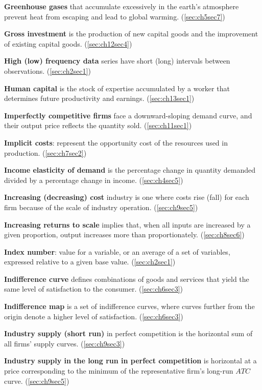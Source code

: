 \textbf{Greenhouse gases} that accumulate excessively in the earth's atmosphere prevent heat from escaping and lead to global warming. (\ref{sec:ch5sec7})

\textbf{Gross investment} is the production of new capital goods and the improvement of existing capital goods. (\ref{sec:ch12sec4})

\textbf{High (low) frequency data} series have short (long) intervals between observations. (\ref{sec:ch2sec1})

\textbf{Human capital} is the stock of expertise accumulated by a worker that determines future productivity and earnings. (\ref{sec:ch13sec1})

\textbf{Imperfectly competitive firms} face a downward-sloping demand curve, and their output price reflects the quantity sold. (\ref{sec:ch11sec1})

\textbf{Implicit costs}: represent the opportunity cost of the resources used in production. (\ref{sec:ch7sec2})

\textbf{Income elasticity of demand} is the percentage change in quantity demanded divided by a percentage change in income. (\ref{sec:ch4sec5})

\textbf{Increasing (decreasing) cost} industry is one where costs rise (fall) for each firm because of the scale of industry operation. (\ref{sec:ch9sec5})

\textbf{Increasing returns to scale} implies that, when all inputs are increased by a given proportion, output increases more than proportionately. (\ref{sec:ch8sec6})

\textbf{Index number}: value for a variable, or an average of a set of variables, expressed relative to a given base value. (\ref{sec:ch2sec1})

\textbf{Indifference curve} defines combinations of goods and services that yield the same level of satisfaction to the consumer. (\ref{sec:ch6sec3})

\textbf{Indifference map} is a set of indifference curves, where curves further from the origin denote a higher level of satisfaction. (\ref{sec:ch6sec3})

\textbf{Industry supply (short run)} in perfect competition is the horizontal sum of all firms' supply curves. (\ref{sec:ch9sec3})

\textbf{Industry supply in the long run in perfect competition} is horizontal at a price corresponding to the minimum of the representative firm's long-run $ATC$ curve. (\ref{sec:ch9sec5})


